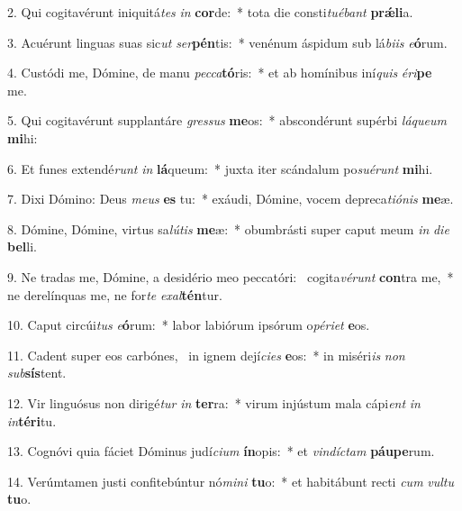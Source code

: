 2. Qui cogitavérunt iniquitá\textit{tes} \textit{in} \textbf{cor}de:~*  tota die consti\textit{tu}\textit{é}\textit{bant} \textbf{prǽ}\textbf{li}a.\

3. Acuérunt linguas suas sic\textit{ut} \textit{ser}\textbf{pén}tis:~*  venénum áspidum sub lá\textit{bi}\textit{is} \textit{e}\textbf{ó}rum.\

4. Custódi me, Dómine, de manu \textit{pec}\textit{ca}\textbf{tó}ris:~*  et ab homínibus iní\textit{quis} \textit{é}\textit{ri}\textbf{pe} me.\

5. Qui cogitavérunt supplantáre \textit{gres}\textit{sus} \textbf{me}os:~*  abscondérunt supérbi \textit{lá}\textit{que}\textit{um} \textbf{mi}hi:\

6. Et funes extendé\textit{runt} \textit{in} \textbf{lá}queum:~*  juxta iter scándalum po\textit{su}\textit{é}\textit{runt} \textbf{mi}hi.\

7. Dixi Dómino: Deus \textit{me}\textit{us} \textbf{es} tu:~*  exáudi, Dómine, vocem depreca\textit{ti}\textit{ó}\textit{nis} \textbf{me}æ.\

8. Dómine, Dómine, virtus sa\textit{lú}\textit{tis} \textbf{me}æ:~*  obumbrásti super caput meum \textit{in} \textit{di}\textit{e} \textbf{bel}li.\

9. Ne tradas me, Dómine, a desidério meo peccatóri: \dag\  cogita\textit{vé}\textit{runt} \textbf{con}tra me,~*  ne derelínquas me, ne for\textit{te} \textit{ex}\textit{al}\textbf{tén}tur.\

10. Caput circúi\textit{tus} \textit{e}\textbf{ó}rum:~*  labor labiórum ipsórum o\textit{pé}\textit{ri}\textit{et} \textbf{e}os.\

11. Cadent super eos carbónes, \dag\  in ignem dejí\textit{ci}\textit{es} \textbf{e}os:~*  in miséri\textit{is} \textit{non} \textit{sub}\textbf{sís}tent.\

12. Vir linguósus non dirigé\textit{tur} \textit{in} \textbf{ter}ra:~*  virum injústum mala cápi\textit{ent} \textit{in} \textit{in}\textbf{tér}\textbf{i}tu.\

13. Cognóvi quia fáciet Dóminus judí\textit{ci}\textit{um} \textbf{ín}opis:~*  et \textit{vin}\textit{díc}\textit{tam} \textbf{páu}\textbf{pe}rum.\

14. Verúmtamen justi confitebúntur nó\textit{mi}\textit{ni} \textbf{tu}o:~*  et habitábunt recti \textit{cum} \textit{vul}\textit{tu} \textbf{tu}o.\

